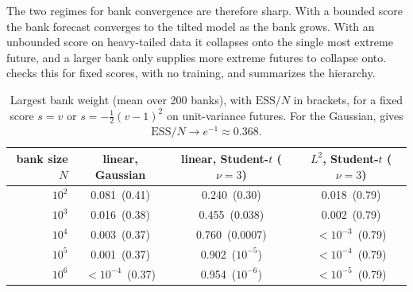 \documentclass[11pt]{article}
\theoremstyle{plain}
\theoremstyle{definition}
\theoremstyle{remark}
\newcommand{\ESS}{\mathrm{ESS}}
\begin{document}
The two regimes for bank convergence are therefore sharp. With a bounded score
the bank forecast converges to the tilted model as the bank grows. With an
unbounded score on heavy-tailed data it collapses onto the single most extreme
future, and a larger bank only supplies more extreme futures to collapse onto.
 checks this for fixed scores, with no training, and
 summarizes the hierarchy.

\begin{table}[ht]
 \centering
 \small
 \begin{tabular}{rccc}
  \toprule
  bank size $N$ & linear, Gaussian & linear, Student-$t$ ($\nu=3$) & $L^2$, Student-$t$ ($\nu=3$) \\
  \midrule
  $10^{2}$      & 0.081\ (0.41)          & 0.240\ (0.30)                       & 0.018\ (0.79)                      \\
  $10^{3}$      & 0.016\ (0.38)          & 0.455\ (0.038)                      & 0.002\ (0.79)                      \\
  $10^{4}$      & 0.003\ (0.37)          & 0.760\ (0.0007)                     & $<10^{-3}$\ (0.79)                 \\
  $10^{5}$      & 0.001\ (0.37)          & 0.902\ ($10^{-5}$)                  & $<10^{-4}$\ (0.79)                 \\
  $10^{6}$      & $<10^{-4}$\ (0.37)     & 0.954\ ($10^{-6}$)                  & $<10^{-5}$\ (0.79)                 \\
  \bottomrule
 \end{tabular}
 \caption{Largest bank weight (mean over 200 banks), with $\ESS/N$ in
  brackets, for a fixed score $s=v$ or $s=-\tfrac12(v-1)^{2}$ on
  unit-variance futures. For the Gaussian,  gives
  $\ESS/N\to e^{-1}\approx0.368$.}
 \label{tab:fixedscore}
\end{table}
\end{document}
